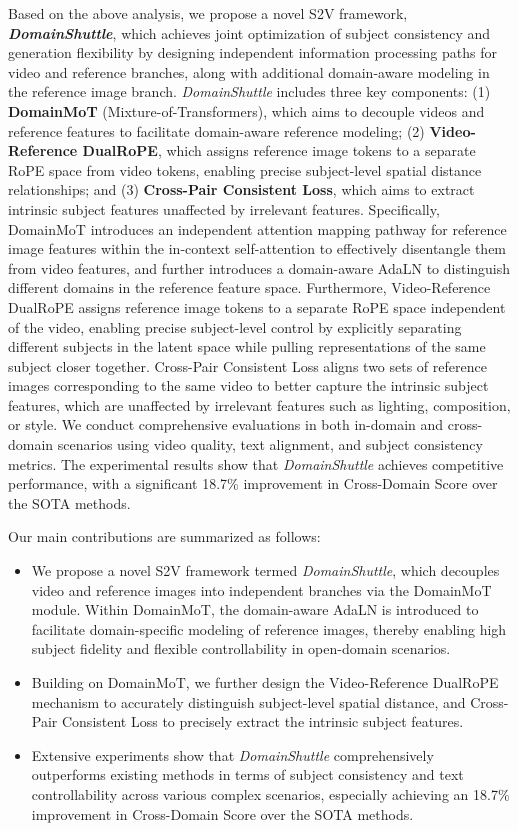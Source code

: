 \documentclass{llmxive}
\begin{document}
Based on the above analysis, we propose a novel S2V framework, \textit{\textbf{DomainShuttle}}, which achieves joint optimization of subject consistency and generation flexibility by designing independent information processing paths for video and reference branches, along with additional domain-aware modeling in the reference image branch. \textit{DomainShuttle} includes three key components: (1) \textbf{DomainMoT} (Mixture-of-Transformers), which aims to decouple videos and reference features to facilitate domain-aware reference modeling; (2) \textbf{Video-Reference DualRoPE}, which assigns reference image tokens to a separate RoPE space from video tokens, enabling precise subject-level spatial distance relationships; and (3) \textbf{Cross-Pair Consistent Loss}, which aims to extract intrinsic subject features unaffected by irrelevant features. Specifically, DomainMoT introduces an independent attention mapping pathway for reference image features within the in-context self-attention to effectively disentangle them from video features, and further introduces a domain-aware AdaLN to distinguish different domains in the reference feature space. Furthermore, Video-Reference DualRoPE assigns reference image tokens to a separate RoPE space independent of the video, enabling precise subject-level control by explicitly separating different subjects in the latent space while pulling representations of the same subject closer together. Cross-Pair Consistent Loss aligns two sets of reference images corresponding to the same video to better capture the intrinsic subject features, which are unaffected by irrelevant features such as lighting, composition, or style. We conduct comprehensive evaluations in both in-domain and cross-domain scenarios using video quality, text alignment, and subject consistency metrics. The experimental results show that \textit{DomainShuttle} achieves competitive performance, with a significant 18.7\% improvement in Cross-Domain Score over the SOTA methods.


Our main contributions are summarized as follows:
\begin{itemize}[label=\textbullet]
    \item  We propose a novel S2V framework termed \textit{DomainShuttle}, which decouples video and reference images into independent branches via the DomainMoT module. Within DomainMoT, the domain-aware AdaLN is introduced to facilitate domain-specific modeling of reference images, thereby enabling high subject fidelity and flexible controllability in open-domain scenarios.
    \item   Building on DomainMoT, we further design the Video-Reference DualRoPE mechanism to accurately distinguish subject-level spatial distance, and Cross-Pair Consistent Loss to precisely extract the intrinsic subject features.
    \item   Extensive experiments show that \textit{DomainShuttle} comprehensively outperforms existing methods in terms of subject consistency and text controllability across various complex scenarios, especially achieving an 18.7\% improvement in Cross-Domain Score over the SOTA methods. 

\end{itemize}
\end{document}
